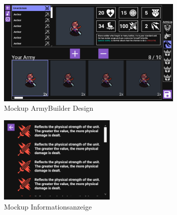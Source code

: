 \documentclass[12pt, titlepage]{scrartcl}
\newcommand{\RN}[1]{%
	\textup{\uppercase\expandafter{\romannumeral#1}}%
}
\begin{document}
		\begin{figure}[H] 
			\centering
			\includegraphics[width=0.8\textwidth]{ArmyBuilder_Design_Two.png}
			\caption{Mockup ArmyBuilder Design \RN{2} }
			\label{ArmyBuilder_Design_Two}
		\end{figure}
		\begin{figure}[H] 
			\centering
			\includegraphics[width=0.5\textwidth]{InfoView.png}
			\caption{Mockup Informationsanzeige \RN{2} }
			\label{InfoView}
		\end{figure}
		
\end{document}
